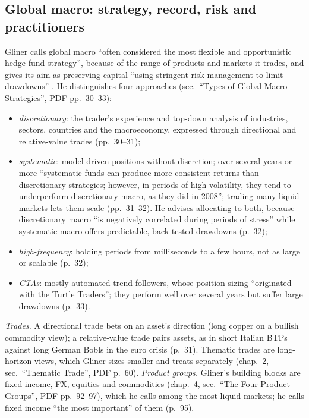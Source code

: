 \subsection{Global macro: strategy, record, risk and practitioners}

\begin{qfdefinition}\label{def:global-macro-strategy}
 Gliner calls global macro ``often considered the most flexible and opportunistic hedge fund strategy'', because of the range of products and markets it trades, and gives its aim as preserving capital ``using stringent risk management to limit drawdowns'' \citep[chap.~1, opening, PDF p.~29]{s7-gliner}. He distinguishes four approaches (sec.\ ``Types of Global Macro Strategies'', PDF pp.~30--33):
\begin{itemize}
\item \emph{discretionary}: the trader's experience and top-down analysis of industries, sectors, countries and the macroeconomy, expressed through directional and relative-value trades (pp.~30--31);
\item \emph{systematic}: model-driven positions without discretion; over several years or more ``systematic funds can produce more consistent returns than discretionary strategies; however, in periods of high volatility, they tend to underperform discretionary macro, as they did in 2008''; trading many liquid markets lets them scale (pp.~31--32). He advises allocating to both, because discretionary macro ``is negatively correlated during periods of stress'' while systematic macro offers predictable, back-tested drawdowns (p.~32);
\item \emph{high-frequency}: holding periods from milliseconds to a few hours, not as large or scalable (p.~32);
\item \emph{CTAs}: mostly automated trend followers, whose position sizing ``originated with the Turtle Traders''; they perform well over several years but suffer large drawdowns (p.~33).
\end{itemize}
\emph{Trades.} A directional trade bets on an asset's direction (long copper on a bullish commodity view); a relative-value trade pairs assets, as in short Italian BTPs against long German Bobls in the euro crisis (p.~31). Thematic trades are long-horizon views, which Gliner sizes smaller and treats separately (chap.~2, sec.\ ``Thematic Trade'', PDF p.~60). \emph{Product groups.} Gliner's building blocks are fixed income, FX, equities and commodities (chap.~4, sec.\ ``The Four Product Groups'', PDF pp.~92--97), which he calls among the most liquid markets; he calls fixed income ``the most important'' of them (p.~95).


\end{qfdefinition}
